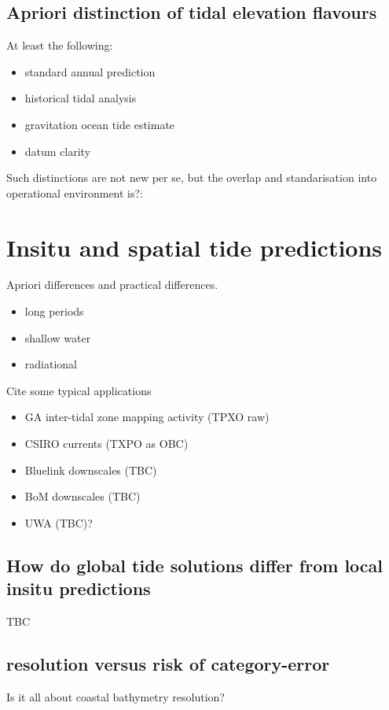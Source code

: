 \subsection{Apriori distinction of tidal elevation flavours}
At least the following:
\begin{itemize}
    \item standard annual prediction
    \item historical tidal analysis
    \item gravitation ocean tide estimate
    \item datum clarity
\end{itemize}

Such distinctions are not new per se, but the overlap and standarisation into operational environment is?:
\citep{godin:1972}

\section{Insitu and spatial tide predictions}

Apriori differences and practical differences.

\begin{itemize}
    \item long periods
    \item shallow water
    \item radiational
\end{itemize}

Cite some typical applications
\begin{itemize}
    \item GA inter-tidal zone mapping activity (TPXO raw)
    \item CSIRO currents (TXPO as OBC)
    \item Bluelink downscales (TBC)
    \item BoM downscales (TBC)
    \item UWA (TBC)?
\end{itemize}

\subsection{How do global tide solutions differ from local insitu predictions}
TBC

\subsection{resolution versus risk of category-error}
Is it all about coastal bathymetry resolution?

